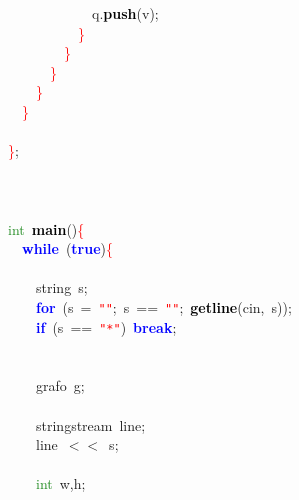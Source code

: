 \documentclass[10pt,a4paper,twoside]{article}
\begin{document}
{{{{{\mbox{}\ \ \ \ \ \ \ \ \ \ \ \ q\textcolor{BrickRed}{.}\textbf{\textcolor{Black}{push}}\textcolor{BrickRed}{(}v\textcolor{BrickRed}{);} \\
\mbox{}\ \ \ \ \ \ \ \ \ \ \textcolor{Red}{\}} \\
\mbox{}\ \ \ \ \ \ \ \ \textcolor{Red}{\}} \\
\mbox{}\ \ \ \ \ \ \textcolor{Red}{\}} \\
\mbox{}\ \ \ \ \textcolor{Red}{\}} \\
\mbox{}\ \ \textcolor{Red}{\}} \\
\mbox{} \\
\mbox{}\textcolor{Red}{\}}\textcolor{BrickRed}{;} \\
\mbox{} \\
\mbox{} \\
\mbox{} \\
\mbox{}\textcolor{ForestGreen}{int}\ \textbf{\textcolor{Black}{main}}\textcolor{BrickRed}{()}\textcolor{Red}{\{} \\
\mbox{}\ \ \textbf{\textcolor{Blue}{while}}\ \textcolor{BrickRed}{(}\textbf{\textcolor{Blue}{true}}\textcolor{BrickRed}{)}\textcolor{Red}{\{} \\
\mbox{} \\
\mbox{}\ \ \ \ string\ s\textcolor{BrickRed}{;} \\
\mbox{}\ \ \ \ \textbf{\textcolor{Blue}{for}}\ \textcolor{BrickRed}{(}s\ \textcolor{BrickRed}{=}\ \texttt{\textcolor{Red}{"{}"{}}}\textcolor{BrickRed}{;}\ s\ \textcolor{BrickRed}{==}\ \texttt{\textcolor{Red}{"{}"{}}}\textcolor{BrickRed}{;}\ \textbf{\textcolor{Black}{getline}}\textcolor{BrickRed}{(}cin\textcolor{BrickRed}{,}\ s\textcolor{BrickRed}{));} \\
\mbox{}\ \ \ \ \textbf{\textcolor{Blue}{if}}\ \textcolor{BrickRed}{(}s\ \textcolor{BrickRed}{==}\ \texttt{\textcolor{Red}{"{}*"{}}}\textcolor{BrickRed}{)}\ \textbf{\textcolor{Blue}{break}}\textcolor{BrickRed}{;} \\
\mbox{} \\
\mbox{} \\
\mbox{}\ \ \ \ grafo\ g\textcolor{BrickRed}{;} \\
\mbox{} \\
\mbox{}\ \ \ \ stringstream\ line\textcolor{BrickRed}{;} \\
\mbox{}\ \ \ \ line\ \textcolor{BrickRed}{$<<$}\ s\textcolor{BrickRed}{;} \\
\mbox{} \\
\mbox{}\ \ \ \ \textcolor{ForestGreen}{int}\ w\textcolor{BrickRed}{,}h\textcolor{BrickRed}{;} \\
}}}}}
\end{document}
